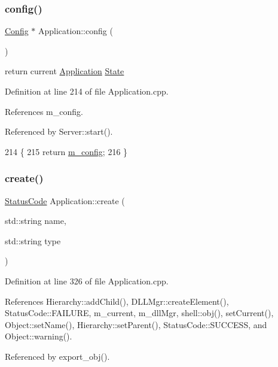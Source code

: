 \subsubsection{\texorpdfstring{config()}{config()}}
{\footnotesize\ttfamily \hyperlink{classConfig}{Config} $\ast$ Application\+::config (\begin{DoxyParamCaption}{ }\end{DoxyParamCaption})}

return current \hyperlink{classApplication}{Application} \hyperlink{classState}{State} 

Definition at line 214 of file Application.\+cpp.



References m\+\_\+config.



Referenced by Server\+::start().


\begin{DoxyCode}
214                               \{
215   \textcolor{keywordflow}{return} \hyperlink{classApplication_ae05f3e253ea871a194c3d30fd1d3b0c3}{m\_config};
216 \}
\end{DoxyCode}
\mbox{\label{classApplication_a552c6df459660f2d80e6d0ac6ce8279b}} 
\subsubsection{\texorpdfstring{create()}{create()}}
{\footnotesize\ttfamily \hyperlink{classStatusCode}{Status\+Code} Application\+::create (\begin{DoxyParamCaption}\item[{std\+::string}]{name,  }\item[{std\+::string}]{type }\end{DoxyParamCaption})}



Definition at line 326 of file Application.\+cpp.



References Hierarchy\+::add\+Child(), D\+L\+L\+Mgr\+::create\+Element(), Status\+Code\+::\+F\+A\+I\+L\+U\+RE, m\+\_\+current, m\+\_\+dll\+Mgr, shell\+::obj(), set\+Current(), Object\+::set\+Name(), Hierarchy\+::set\+Parent(), Status\+Code\+::\+S\+U\+C\+C\+E\+SS, and Object\+::warning().



Referenced by export\+\_\+obj().


